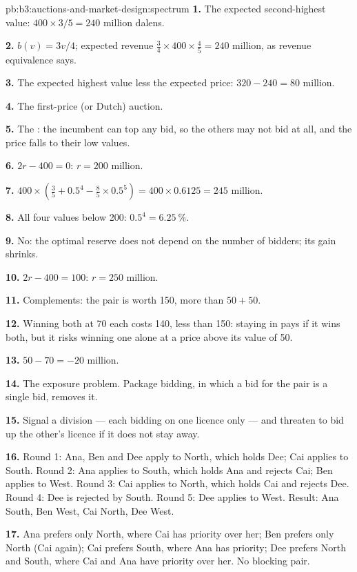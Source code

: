 \begin{solution}{pb:b3:auctions-and-market-design:spectrum}
\textbf{1.} The expected second-highest value: $400 \times 3/5 = 240$ million dalens.

\textbf{2.} $b(v) = 3v/4$; expected revenue $\tfrac34 \times 400 \times \tfrac45 = 240$ million, as revenue equivalence says.

\textbf{3.} The expected highest value less the expected price: $320 - 240 = 80$ million.

\textbf{4.} The first-price (or Dutch) auction.

\textbf{5.} The : the incumbent can top any bid, so the others may not
bid at all, and the price falls to their low values.

\textbf{6.} $2r - 400 = 0$: $r = 200$ million.

\textbf{7.} $400 \times (\tfrac35 + 0.5^4 - \tfrac85 \times 0.5^5) = 400 \times 0.6125 = 245$ million.

\textbf{8.} All four values below 200: $0.5^4 = 6.25~\%$.

\textbf{9.} No: the optimal reserve does not depend on the number of bidders; its gain shrinks.

\textbf{10.} $2r - 400 = 100$: $r = 250$ million.

\textbf{11.} Complements: the pair is worth 150, more than $50 + 50$.

\textbf{12.} Winning both at 70 each costs 140, less than 150: staying in pays if it wins both, but
it risks winning one alone at a price above its value of 50.

\textbf{13.} $50 - 70 = -20$ million.

\textbf{14.} The exposure problem. Package bidding, in which a bid for the pair is a single
bid, removes it.

\textbf{15.} Signal a division --- each bidding on one licence only --- and threaten to
bid up the other's licence if it does not stay away.

\textbf{16.} Round 1: Ana, Ben and Dee apply to North, which holds Dee; Cai applies to South.
Round 2: Ana applies to South, which holds Ana and rejects Cai; Ben applies to West. Round 3:
Cai applies to North, which holds Cai and rejects Dee. Round 4: Dee is rejected by South. Round 5:
Dee applies to West. Result: Ana South, Ben West, Cai North, Dee West.

\textbf{17.} Ana prefers only North, where Cai has priority over her; Ben prefers only North
(Cai again); Cai prefers South, where Ana has priority; Dee prefers North and South, where
Cai and Ana have priority over her. No blocking pair.


\end{solution}
